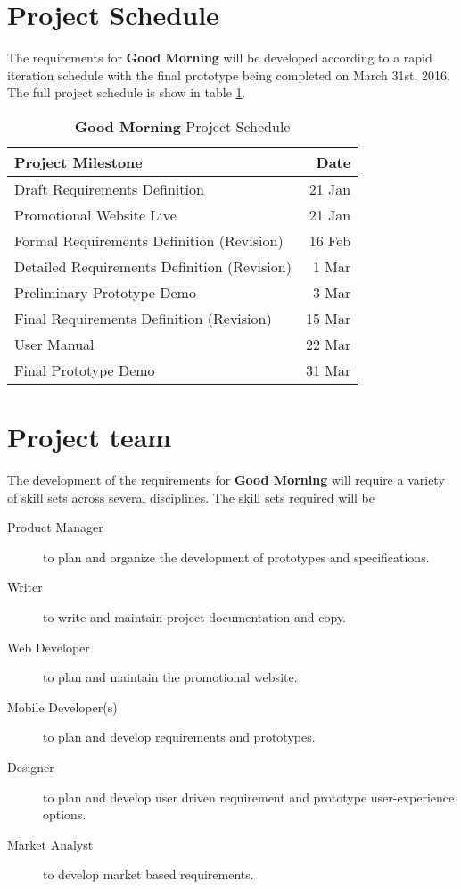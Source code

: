 \documentclass[11pt]{article}
\begin{document}
\section{Project Schedule}\label{project-schedule}

The requirements for \textbf{Good Morning} will be developed according to a rapid iteration schedule with the final prototype being completed on March 31st, 2016. The full project schedule is show in table \ref{tab:schedule}.

\begin{table}[htb]
    \caption{\textbf{Good Morning} Project Schedule}\label{tab:schedule}
    \centering
    \begin{tabular}{|lr|}
        \hline
        \textbf{Project Milestone} & \textbf{Date} \\
        \hline
        Draft Requirements Definition & 21 Jan \\
        Promotional Website Live & 21 Jan \\
        Formal Requirements Definition (Revision) & 16 Feb \\
        Detailed Requirements Definition (Revision) & 1 Mar \\
        Preliminary Prototype Demo & 3 Mar \\
        Final Requirements Definition (Revision) & 15 Mar \\
        User Manual & 22 Mar \\
        Final Prototype Demo & 31 Mar \\
        \hline
    \end{tabular}
\end{table}



%
\section{Project team}\label{project-team}

The development of the requirements for \textbf{Good Morning} will require a variety of skill sets across several disciplines. The skill sets required will be

\begin{description}
  \item[Product Manager] to plan and organize the development of prototypes and specifications.
  \item[Writer] to write and maintain project documentation and copy.
  \item[Web Developer] to plan and maintain the promotional website.
  \item[Mobile Developer(s)] to plan and develop requirements and prototypes.
  \item[Designer] to plan and develop user driven requirement and prototype user-experience options.
  \item[Market Analyst] to develop market based requirements.
\end{description}
\end{document}
